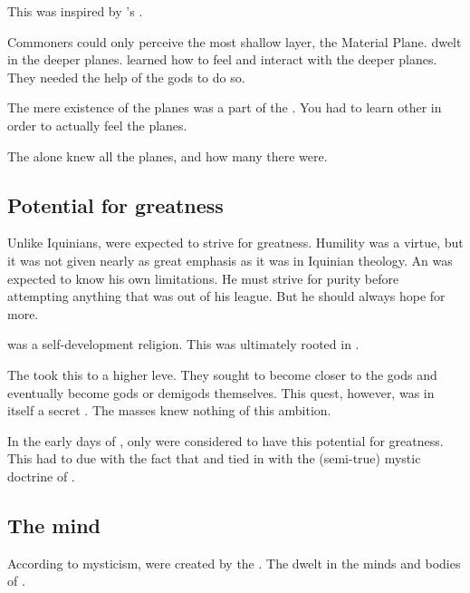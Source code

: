 This was inspired by \Sethicus's . 

Commoners could only perceive the most shallow layer, the Material Plane. 
\Daimonia dwelt in the deeper planes. 
\Rethyaxes learned how to feel and interact with the deeper planes. 
They needed the help of the gods to do so. 

The mere existence of the planes was a part of the .
You had to learn other \arcana in order to actually feel the planes. 

The \Primordials alone knew all the planes, and how many there were. 









\subsection{Potential for greatness}
Unlike Iquinians, \Ortaicans were expected to strive for greatness. 
Humility was a virtue, but it was not given nearly as great emphasis as it was in Iquinian theology. 
An \Ortaican was expected to know his own limitations.
He must strive for purity before attempting anything that was out of his league.
But he should always hope for more. 

\Ortaicanism was a self-development religion. 
This was ultimately rooted in .

The \rethyaxes took this to a higher leve. 
They sought to become closer to the gods and eventually become gods or demigods themselves.
This quest, however, was in itself a secret \arcanum.
The masses knew nothing of this ambition.

In the early days of \Ortaica, only \scathae were considered to have this potential for greatness. 
This had to due with the fact that  and tied in with the (semi-true) mystic doctrine of . 









\subsection[The Scathaese mind]{The \scathaese mind}
According to \rethyax mysticism, \scathae were created by the .
The {\Primordials dwelt in the minds and bodies of \scathae}. 

